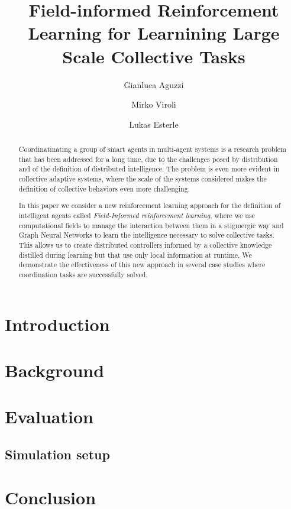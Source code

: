 \documentclass[runningheads]{llncs}
\begin{document}
%
\title{Field-informed Reinforcement Learning for Learnining Large Scale Collective Tasks} %
%
\author{Gianluca Aguzzi \and
Mirko Viroli  \and
Lukas Esterle   
}
%
%

%
\maketitle              %
%
\begin{abstract}
Coordinatinating a group of smart agents in multi-agent systems 
 is a research problem that has been addressed for a long time, 
 due to the challenges posed by distribution and of the definition of distributed intelligence. 
%
The problem is even more evident in collective adaptive systems, 
 where the scale of the systems considered makes the definition of collective behaviors even more challenging. 

In this paper we consider a new reinforcement learning approach 
  for the definition of intelligent agents called \emph{Field-Informed reinforcement learning}, 
  where we use computational fields to manage the interaction between them in a stigmergic way 
  and Graph Neural Networks to learn the intelligence necessary to solve collective tasks. 
%
This allows us to create distributed controllers informed by a collective knowledge 
 distilled during learning but that use only local information at runtime.
% 
We demonstrate the effectiveness of this new approach in several case studies 
 where coordination tasks are successfully solved.
\end{abstract}
%
\section{Introduction}

\section{Background}


\section{Evaluation}
\subsection{Simulation setup}


\section{Conclusion}
\end{document}
